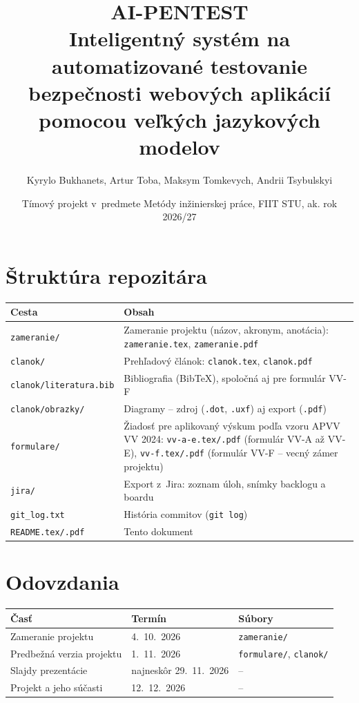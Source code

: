 \documentclass[11pt,a4paper]{article}
\title{AI-PENTEST\\[4pt]\large Inteligentný systém na automatizované testovanie bezpečnosti webových aplikácií pomocou veľkých jazykových modelov}
\author{Kyrylo Bukhanets, Artur Toba, Maksym Tomkevych, Andrii Tsybulskyi}
\date{\small Tímový projekt v~predmete Metódy inžinierskej práce, FIIT STU, ak. rok 2026/27}
\begin{document}
\maketitle

\section*{Štruktúra repozitára}

\begin{tabularx}{\textwidth}{@{}lX@{}}
\toprule
\textbf{Cesta} & \textbf{Obsah} \\ \midrule
\texttt{zameranie/} & Zameranie projektu (názov, akronym, anotácia): \texttt{zameranie.tex}, \texttt{zameranie.pdf} \\
\texttt{clanok/} & Prehľadový článok: \texttt{clanok.tex}, \texttt{clanok.pdf} \\
\texttt{clanok/literatura.bib} & Bibliografia (BibTeX), spoločná aj pre formulár VV-F \\
\texttt{clanok/obrazky/} & Diagramy -- zdroj (\texttt{.dot}, \texttt{.uxf}) aj export (\texttt{.pdf}) \\
\texttt{formulare/} & Žiadosť pre aplikovaný výskum podľa vzoru APVV VV 2024: \texttt{vv-a-e.tex/.pdf} (formulár VV-A až VV-E), \texttt{vv-f.tex/.pdf} (formulár VV-F -- vecný zámer projektu) \\
\texttt{jira/} & Export z~Jira: zoznam úloh, snímky backlogu a boardu \\
\texttt{git\_log.txt} & História commitov (\texttt{git log}) \\
\texttt{README.tex/.pdf} & Tento dokument \\ \bottomrule
\end{tabularx}

\section*{Odovzdania}

\begin{tabularx}{\textwidth}{@{}Xll@{}}
\toprule
\textbf{Časť} & \textbf{Termín} & \textbf{Súbory} \\ \midrule
Zameranie projektu & 4.~10.~2026 & \texttt{zameranie/} \\
Predbežná verzia projektu & 1.~11.~2026 & \texttt{formulare/}, \texttt{clanok/} \\
Slajdy prezentácie & najneskôr 29.~11.~2026 & -- \\
Projekt a jeho súčasti & 12.~12.~2026 & -- \\ \bottomrule
\end{tabularx}
\end{document}
